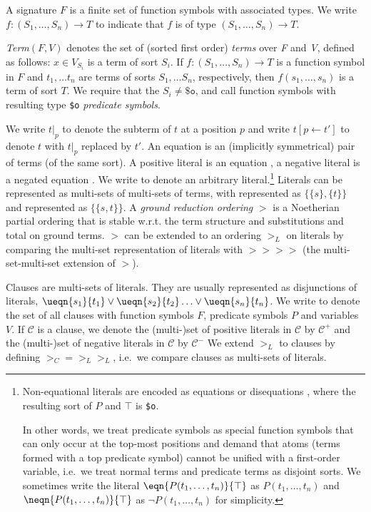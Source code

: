 \documentclass{report}
\begin{document}
A signature $F$ is a finite set of function symbols with associated
types. We write $f:(S_1, \ldots, S_n)
 \to T$ to indicate that $f$ is
of type $(S_1, \ldots, S_n) \to T$.

\emph{Term}$(F,V)$ denotes the set of (sorted first order)
\emph{terms} over \emph{F} and \emph{V}, defined as follows:
$x \in V_{S_i}$ is a term of sort $S_i$. If
$f:(S_1, \ldots, S_n) \to T$ is a function symbol in $F$ and
$t_1, \ldots t_n$ are terms of sorts $S_1, \ldots S_n$, respectively,
then $f(s_1, \ldots, s_n)$ is a term of sort $T$. We require that the
$S_i\not=\mathtt{\$o}$, and call function symbols with resulting type
\texttt{\$o} \emph{predicate symbols}.

We write $t|_p$ to denote the subterm of $t$ at a
position $p$ and write $t[p\leftarrow t']$ to denote $t$ with $t|_p$
replaced by $t'$. An equation  is an
(implicitly symmetrical) pair of terms (of the same sort). A positive
literal is an equation , a negative literal
is a negated equation .  We write  to denote an
arbitrary literal.\footnote{Non-equational literals are encoded as
  equations or disequations , where
  the resulting sort of $P$ and $\top$ is \texttt{\$o}.

  In other words, we treat predicate symbols as special function
  symbols that can only occur at the top-most positions and demand
  that atoms (terms formed with a top predicate symbol) cannot be
  unified with a first-order variable, i.e.\ we treat normal terms and
  predicate terms as disjoint sorts. We sometimes write the literal
  $\eqn{P(t_1, \ldots, t_n)}{\top}$ as $P(t_1, \ldots, t_n)$ and
  $\neqn{P(t_1, \ldots, t_n)}{\top}$ as $\neg P(t_1, \ldots, t_n)$ for
  simplicity.} Literals can be represented as multi-sets of multi-sets
of terms, with  represented as $\{\{s\},\{t\}\}$ and
 represented as $\{\{s, t\}\}$.  A \emph{ground reduction
  ordering} $>$ is a
Noetherian partial ordering that is stable w.r.t. the term structure
and substitutions and total on ground terms. $>$ can be extended to an
ordering $>_L$ on literals by comparing the multi-set representation
of literals with $>\!\!> >\!\!>$ (the multi-set-multi-set extension of
$>$).

Clauses are multi-sets of literals. They are usually represented as
disjunctions of literals, $\ueqn{s_1}{t_1} \vee \ueqn{s_2}{t_2} \ldots
\vee \ueqn{s_n}{t_n}$. We write  to denote the set
of all clauses with function symbols $F$, predicate symbols $P$ and
variables $V$. If $\mathcal{C}$ is a clause, we denote the (multi-)set
of positive literals in $\mathcal{C}$ by $\mathcal{C^+}$ and the
(multi-)set of negative literals in $\mathcal{C}$ by $\mathcal{C^-}$
We extend $>_L$ to clauses by defining $>_C = >_L>_L$, i.e.\ we
compare clauses as multi-sets of literals.
\end{document}
